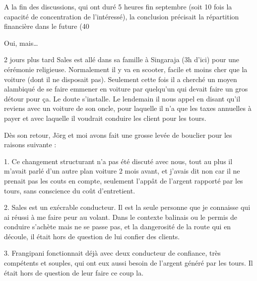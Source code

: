 \par
A la fin des discussions, qui ont duré 5 heures fin septembre (soit 10 fois la capacité de concentration de l’intéressé), la conclusion précisait la répartition financière dans le future (40%

\par
Oui, mais…

\par
2 jours plus tard Sales est allé dans sa famille à Singaraja (3h d’ici) pour une cérémonie religieuse. Normalement il y va en scooter, facile et moins cher que la voiture (dont il ne disposait pas). Seulement cette fois il a cherché un moyen alambiqué de se faire emmener en voiture par quelqu’un qui devait faire un gros détour pour ça. Le doute s’installe. Le lendemain il nous appel en disant qu’il reviens avec un voiture de son oncle, pour laquelle il n’a que les taxes annuelles à payer et avec laquelle il voudrait conduire les client pour les tours.

\par
Dès son retour, Jörg et moi avons fait une grosse levée de bouclier pour les raisons suivante :

\par
1. Ce changement structurant n’a pas été discuté avec nous, tout au plus il m’avait parlé d’un autre plan voiture 2 mois avant, et j’avais dit non car il ne prenait pas les couts en compte, seulement l’appât de l’argent rapporté par les tours, sans conscience du coût d’entretient.

\par
2. Sales est un exécrable conducteur. Il est la seule personne que je connaisse qui ai réussi à me faire peur au volant. Dans le contexte balinais ou le permis de conduire s’achète mais ne se passe pas, et la dangerosité de la route qui en découle, il était hors de question de lui confier des clients.

\par
3. Frangipani fonctionnait déjà avec deux conducteur de confiance, très compétents et souples, qui ont eux aussi besoin de l’argent généré par les tours. Il était hors de question de leur faire ce coup la.

